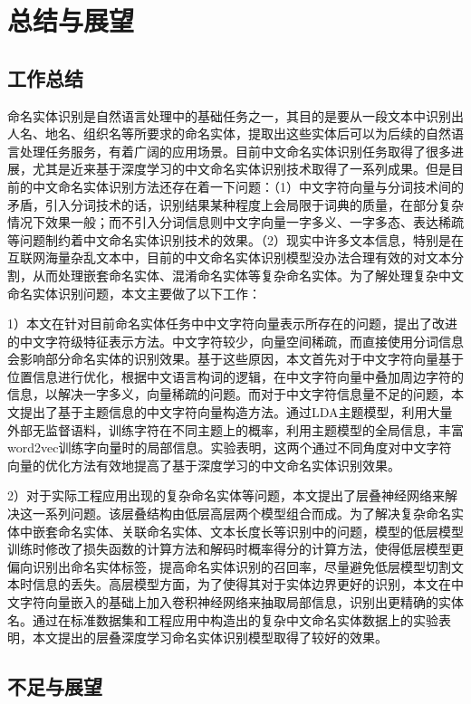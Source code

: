 \documentclass[winfonts,master,oneside,nobackinfo]{njuthesis}
\begin{document}
\chapter{总结与展望}

\section{工作总结}

命名实体识别是自然语言处理中的基础任务之一，其目的是要从一段文本中识别出人名、地名、组织名等所要求的命名实体，提取出这些实体后可以为后续的自然语言处理任务服务，有着广阔的应用场景。目前中文命名实体识别任务取得了很多进展，尤其是近来基于深度学习的中文命名实体识别技术取得了一系列成果。但是目前的中文命名实体识别方法还存在着一下问题：（1）中文字符向量与分词技术间的矛盾，引入分词技术的话，识别结果某种程度上会局限于词典的质量，在部分复杂情况下效果一般；而不引入分词信息则中文字向量一字多义、一字多态、表达稀疏等问题制约着中文命名实体识别技术的效果。（2）现实中许多文本信息，特别是在互联网海量杂乱文本中，目前的中文命名实体识别模型没办法合理有效的对文本分割，从而处理嵌套命名实体、混淆命名实体等复杂命名实体。为了解处理复杂中文命名实体识别问题，本文主要做了以下工作：

1）本文在针对目前命名实体任务中中文字符向量表示所存在的问题，提出了改进的中文字符级特征表示方法。中文字符较少，向量空间稀疏，而直接使用分词信息会影响部分命名实体的识别效果。基于这些原因，本文首先对于中文字符向量基于位置信息进行优化，根据中文语言构词的逻辑，在中文字符向量中叠加周边字符的信息，以解决一字多义，向量稀疏的问题。而对于中文字符信息量不足的问题，本文提出了基于主题信息的中文字符向量构造方法。通过LDA主题模型，利用大量外部无监督语料，训练字符在不同主题上的概率，利用主题模型的全局信息，丰富word2vec训练字向量时的局部信息。实验表明，这两个通过不同角度对中文字符向量的优化方法有效地提高了基于深度学习的中文命名实体识别效果。

2）对于实际工程应用出现的复杂命名实体等问题，本文提出了层叠神经网络来解决这一系列问题。该层叠结构由低层高层两个模型组合而成。为了解决复杂命名实体中嵌套命名实体、关联命名实体、文本长度长等识别中的问题，模型的低层模型训练时修改了损失函数的计算方法和解码时概率得分的计算方法，使得低层模型更偏向识别出命名实体标签，提高命名实体识别的召回率，尽量避免低层模型切割文本时信息的丢失。高层模型方面，为了使得其对于实体边界更好的识别，本文在中文字符向量嵌入的基础上加入卷积神经网络来抽取局部信息，识别出更精确的实体名。通过在标准数据集和工程应用中构造出的复杂中文命名实体数据上的实验表明，本文提出的层叠深度学习命名实体识别模型取得了较好的效果。

\section{不足与展望}
\end{document}
